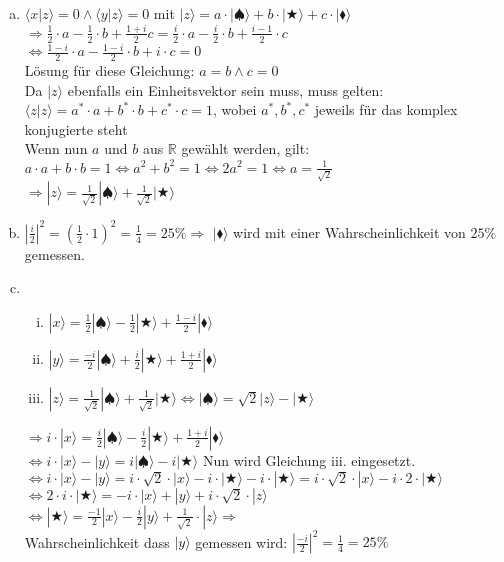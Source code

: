 \documentclass[a4paper]{scrartcl}
\begin{document}
\begin{enumerate}[a)]
\item $\langle x|z\rangle=0 \wedge \langle y|z\rangle=0$ mit $|z\rangle = a\cdot|\spadesuit\rangle+b\cdot|\bigstar\rangle+c\cdot|\blacklozenge\rangle$\\
$\Rightarrow \frac{1}{2}\cdot a-\frac{1}{2}\cdot b+\frac{1+i}{2}c = \frac{i}{2}\cdot a- \frac{i}{2}\cdot b+\frac{i-1}{2}\cdot c$\\
$\Leftrightarrow \frac{1-i}{2} \cdot a- \frac{1-i}{2} \cdot b + i \cdot c =0$\\
Lösung für diese Gleichung: $a=b \wedge c=0$\\
Da $|z\rangle$ ebenfalls ein Einheitsvektor sein muss, muss gelten:\\
$\langle z|z\rangle=a^*\cdot a+ b^* \cdot b + c^* \cdot c =1$, wobei $a^*, b^*, c^*$ jeweils für das komplex konjugierte steht\\
Wenn nun $a$ und $b$ aus $\mathbb{R}$ gewählt werden, gilt:\\
$a\cdot a+ b \cdot b =1 \Leftrightarrow a^2+b^2= 1 \Leftrightarrow 2a^2=1 \Leftrightarrow a =\frac{1}{\sqrt{2}}$\\
$\Rightarrow |z\rangle= \frac{1}{\sqrt{2}}|\spadesuit\rangle+\frac{1}{\sqrt{2}}|\bigstar\rangle$

\item $|\frac{i}{2}|^2= (\frac{1}{2}\cdot 1)^2=\frac{1}{4}=25\% \Rightarrow$ $|\blacklozenge\rangle$ wird mit einer Wahrscheinlichkeit von $25\%$ gemessen.

\item \begin{enumerate}[i.]
\item $|x\rangle= \frac{1}{2}|\spadesuit\rangle-\frac{1}{2}|\bigstar\rangle+\frac{1-i}{2}|\blacklozenge\rangle$
\item $|y\rangle= \frac{-i}{2}|\spadesuit\rangle+\frac{i}{2}|\bigstar\rangle+\frac{1+i}{2}|\blacklozenge\rangle$
\item $|z\rangle= \frac{1}{\sqrt{2}}|\spadesuit\rangle+\frac{1}{\sqrt{2}}|\bigstar\rangle \Leftrightarrow |\spadesuit\rangle = \sqrt{2}|z\rangle-|\bigstar\rangle$
\end{enumerate}

$\Rightarrow i \cdot |x\rangle = \frac{i}{2}|\spadesuit\rangle-\frac{i}{2}|\bigstar\rangle+\frac{1+i}{2}|\blacklozenge\rangle$\\
$\Leftrightarrow i \cdot |x\rangle -|y\rangle = i|\spadesuit\rangle-i|\bigstar\rangle$ Nun wird Gleichung iii. eingesetzt.\\
$\Leftrightarrow i \cdot |x\rangle -|y\rangle = i\cdot \sqrt{2}\cdot|x\rangle-i\cdot|\bigstar\rangle-i\cdot|\bigstar\rangle= i\cdot \sqrt{2}\cdot|x\rangle-i\cdot 2\cdot |\bigstar\rangle$\\
$\Leftrightarrow 2\cdot i\cdot|\bigstar\rangle= -i \cdot|x\rangle+|y\rangle+i\cdot \sqrt{2} \cdot |z\rangle$\\
$\Leftrightarrow |\bigstar\rangle= \frac{-1}{2}|x\rangle-\frac{i}{2}|y\rangle+\frac{1}{\sqrt{2}}\cdot |z\rangle \Rightarrow$\\
Wahrscheinlichkeit dass $|y\rangle$ gemessen wird: $|\frac{-i}{2}|^2=\frac{1}{4}=25\%$


\end{enumerate}
\end{document}
